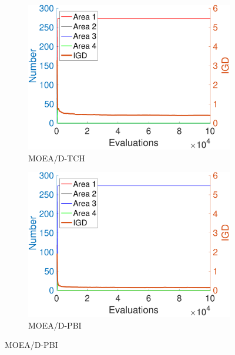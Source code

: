 \documentclass[conference]{IEEEtran}
\begin{document}
\begin{figure}[htbp]
    
    \begin{subfigure}[b]{.22\textwidth}
    \includegraphics[width=\linewidth]{Section5/dim4/Diversity/MOEAD_TCH}
    \caption{MOEA/D-TCH}
    \end{subfigure}
    \begin{subfigure}[b]{.22\textwidth}
    \includegraphics[width=\linewidth]{Section5/dim4/Diversity/MOEAD_PBI}
    \caption{MOEA/D-PBI}
    \end{subfigure}
    

\end{figure}
\end{document}
